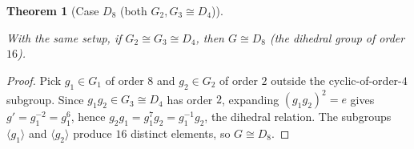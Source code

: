 \documentclass{article}
\newtheorem{theorem}{Theorem}[section]
\theoremstyle{definition}
\newcommand{\lean}[1]{}
\newcommand{\leanok}{}
\newcommand{\leanfile}[1]{}
\newcommand{\uses}[1]{}
\begin{document}
\begin{theorem}[Case $D_8$ (both $G_2, G_3 \cong D_4$)]
    \label{thm:case-dihedral-eight}
    \lean{OrderSixteen.center_two_dihedral}
    \leanfile{M2rGroup7/SixteenCase.lean}
    \uses{lem:one-Gi-cyclic-order-eight, lem:subgroup-product-card}
    \leanok
    With the same setup, if $G_2 \cong G_3 \cong D_4$, then $G \cong D_8$
    (the dihedral group of order $16$).
\end{theorem}
\begin{proof}
    \uses{lem:one-Gi-cyclic-order-eight,lem:subgroup-product-card}
    Pick $g_1 \in G_1$ of order $8$ and $g_2 \in G_2$ of order $2$ outside
    the cyclic-of-order-$4$ subgroup. Since $g_1 g_2 \in G_3 \cong D_4$ has
    order $2$, expanding $(g_1 g_2)^2 = e$ gives $g' = g_1^{-2} = g_1^6$,
    hence $g_2 g_1 = g_1^7 g_2 = g_1^{-1} g_2$, the dihedral relation. The
    subgroups $\langle g_1\rangle$ and $\langle g_2\rangle$ produce
    $16$ distinct elements, so $G \cong D_8$.
\end{proof}
\end{document}
